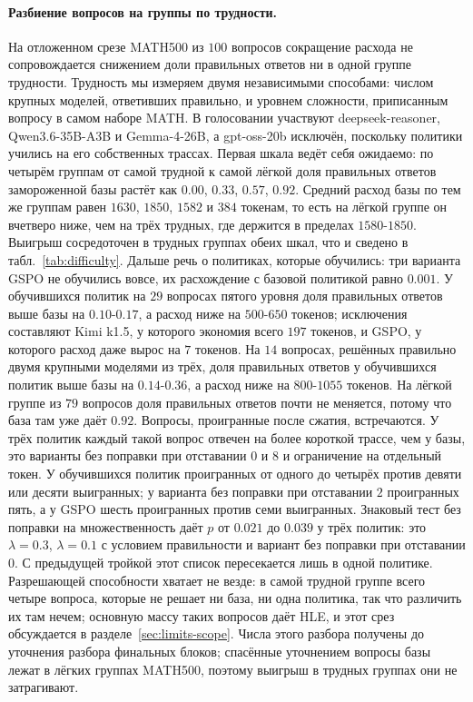 \documentclass[11pt]{article}
\begin{document}
\paragraph{Разбиение вопросов на группы по трудности.} На отложенном срезе MATH500 из $100$ вопросов сокращение расхода не сопровождается снижением доли правильных ответов ни в одной группе трудности. Трудность мы измеряем двумя независимыми способами: числом крупных моделей, ответивших правильно, и уровнем сложности, приписанным вопросу в самом наборе MATH. В голосовании участвуют deepseek-reasoner, Qwen3.6-35B-A3B и Gemma-4-26B, а gpt-oss-20b исключён, поскольку политики учились на его собственных трассах. Первая шкала ведёт себя ожидаемо: по четырём группам от самой трудной к самой лёгкой доля правильных ответов замороженной базы растёт как $0.00$, $0.33$, $0.57$, $0.92$. Средний расход базы по тем же группам равен $1630$, $1850$, $1582$ и $384$ токенам, то есть на лёгкой группе он вчетверо ниже, чем на трёх трудных, где держится в пределах $1580$-$1850$. Выигрыш сосредоточен в трудных группах обеих шкал, что и сведено в табл.~\ref{tab:difficulty}. Дальше речь о политиках, которые обучились: три варианта GSPO не обучились вовсе, их расхождение с базовой политикой равно $0.001$. У обучившихся политик на $29$ вопросах пятого уровня доля правильных ответов выше базы на $0.10$-$0.17$, а расход ниже на $500$-$650$ токенов; исключения составляют Kimi k1.5, у которого экономия всего $197$ токенов, и GSPO, у которого расход даже вырос на $7$ токенов. На $14$ вопросах, решённых правильно двумя крупными моделями из трёх, доля правильных ответов у обучившихся политик выше базы на $0.14$-$0.36$, а расход ниже на $800$-$1055$ токенов. На лёгкой группе из $79$ вопросов доля правильных ответов почти не меняется, потому что база там уже даёт $0.92$. Вопросы, проигранные после сжатия, встречаются. У трёх политик каждый такой вопрос отвечен на более короткой трассе, чем у базы, это варианты без поправки при отставании $0$ и $8$ и ограничение на отдельный токен. У обучившихся политик проигранных от одного до четырёх против девяти или десяти выигранных; у варианта без поправки при отставании $2$ проигранных пять, а у GSPO шесть проигранных против семи выигранных. Знаковый тест без поправки на множественность даёт $p$ от $0.021$ до $0.039$ у трёх политик: это $\lambda{=}0.3$, $\lambda{=}0.1$ с условием правильности и вариант без поправки при отставании $0$. С предыдущей тройкой этот список пересекается лишь в одной политике. Разрешающей способности хватает не везде: в самой трудной группе всего четыре вопроса, которые не решает ни база, ни одна политика, так что различить их там нечем; основную массу таких вопросов даёт HLE, и этот срез обсуждается в разделе~\ref{sec:limits-scope}. Числа этого разбора получены до уточнения разбора финальных блоков; спасённые уточнением вопросы базы лежат в лёгких группах MATH500, поэтому выигрыш в трудных группах они не затрагивают.
\end{document}
